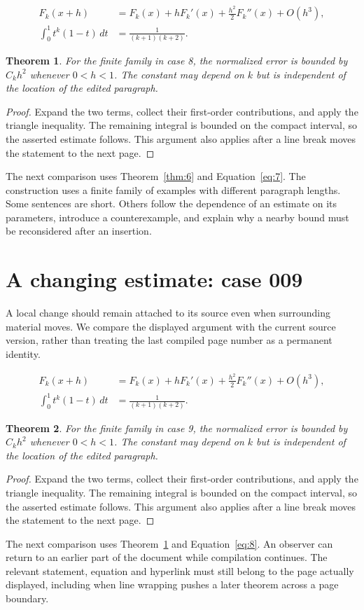 \documentclass[a4paper,10pt]{article}
\newtheorem{theorem}{Theorem}[section]
\begin{document}
\lipsum[22-23]
\begin{align}\label{eq:7}
 F_k(x+h)&=F_k(x)+hF_k'(x)+\frac{h^2}{2}F_k''(x)+O(h^3),\\
 \int_0^1 t^k(1-t)\,dt&=\frac{1}{(k+1)(k+2)}.
\end{align}
\begin{theorem}\label{thm:7}
For the finite family in case 8, the normalized error is bounded by $C_k h^2$ whenever $0<h<1$. The constant may depend on $k$ but is independent of the location of the edited paragraph.
\end{theorem}
\begin{proof}
Expand the two terms, collect their first-order contributions, and apply the
triangle inequality. The remaining integral is bounded on the compact interval,
so the asserted estimate follows. This argument also applies after a line break
moves the statement to the next page.
\end{proof}
The next comparison uses Theorem~\ref{thm:6} and Equation~\ref{eq:7}. The construction uses a finite family of examples with different paragraph lengths. Some sentences are short. Others follow the dependence of an estimate on its parameters, introduce a counterexample, and explain why a nearby bound must be reconsidered after an insertion.

\lipsum[13]

\section{A changing estimate: case 009}\label{unit:8}
A local change should remain attached to its source even when surrounding material moves. We compare the displayed argument with the current source version, rather than treating the last compiled page number as a permanent identity.

\lipsum[25-26]
\begin{align}\label{eq:8}
 F_k(x+h)&=F_k(x)+hF_k'(x)+\frac{h^2}{2}F_k''(x)+O(h^3),\\
 \int_0^1 t^k(1-t)\,dt&=\frac{1}{(k+1)(k+2)}.
\end{align}
\begin{theorem}\label{thm:8}
For the finite family in case 9, the normalized error is bounded by $C_k h^2$ whenever $0<h<1$. The constant may depend on $k$ but is independent of the location of the edited paragraph.
\end{theorem}
\begin{proof}
Expand the two terms, collect their first-order contributions, and apply the
triangle inequality. The remaining integral is bounded on the compact interval,
so the asserted estimate follows. This argument also applies after a line break
moves the statement to the next page.
\end{proof}
The next comparison uses Theorem~\ref{thm:7} and Equation~\ref{eq:8}. An observer can return to an earlier part of the document while compilation continues. The relevant statement, equation and hyperlink must still belong to the page actually displayed, including when line wrapping pushes a later theorem across a page boundary.
\end{document}
